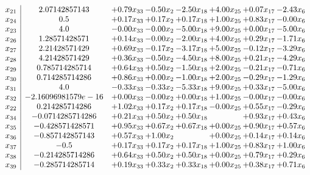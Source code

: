 \documentclass[8pt]{article}
\begin{document}
\[\begin{array}{c| c c@{\hskip 2pt} c@{\hskip 2pt} c@{\hskip 2pt} c@{\hskip 2pt} c@{\hskip 2pt} c@{\hskip 2pt} }
 x_{21}   &  2.07142857143 & +  0.79 x_{33} & -0.50 x_{2} & -2.50 x_{18} & +  4.00 x_{25} & +  0.07 x_{17} & -2.43 x_{6}\\
 x_{24}   &  0.5 & +  0.17 x_{33} & +  0.17 x_{2} & +  0.17 x_{18} & +  1.00 x_{25} & +  0.83 x_{17} & -0.00 x_{6}\\
 x_{23}   &  4.0 & -0.00 x_{33} & -0.00 x_{2} & -5.00 x_{18} & +  9.00 x_{25} & +  0.00 x_{17} & -5.00 x_{6}\\
 x_{26}   &  1.28571428571 & +  0.14 x_{33} & -0.00 x_{2} & -2.00 x_{18} & +  4.00 x_{25} & +  0.29 x_{17} & -1.71 x_{6}\\
 x_{27}   &  2.21428571429 & +  0.69 x_{33} & -0.17 x_{2} & -3.17 x_{18} & +  5.00 x_{25} & -0.12 x_{17} & -3.29 x_{6}\\
 x_{28}   &  4.21428571429 & +  0.36 x_{33} & -0.50 x_{2} & -4.50 x_{18} & +  8.00 x_{25} & +  0.21 x_{17} & -4.29 x_{6}\\
 x_{29}   &  0.785714285714 & +  0.64 x_{33} & +  0.50 x_{2} & -1.50 x_{18} & +  2.00 x_{25} & -0.21 x_{17} & -0.71 x_{6}\\
 x_{30}   &  0.714285714286 & +  0.86 x_{33} & +  0.00 x_{2} & -1.00 x_{18} & +  2.00 x_{25} & -0.29 x_{17} & -1.29 x_{6}\\
 x_{31}   &  4.0 & -0.33 x_{33} & -0.33 x_{2} & -5.33 x_{18} & +  9.00 x_{25} & +  0.33 x_{17} & -5.00 x_{6}\\
 x_{32}   &  -2.16096981579e-16 & +  0.00 x_{33} & -0.00 x_{2} & +  0.00 x_{18} & +  1.00 x_{25} & -0.00 x_{17} & -0.00 x_{6}\\
 x_{22}   &  0.214285714286 & +  1.02 x_{33} & +  0.17 x_{2} & +  0.17 x_{18} & -0.00 x_{25} & +  0.55 x_{17} & -0.29 x_{6}\\
 x_{34}   &  -0.0714285714286 & +  0.21 x_{33} & +  0.50 x_{2} & +  0.50 x_{18} &   & +  0.93 x_{17} & +  0.43 x_{6}\\
 x_{35}   &  -0.428571428571 & +  0.95 x_{33} & +  0.67 x_{2} & +  0.67 x_{18} & +  0.00 x_{25} & +  0.90 x_{17} & +  0.57 x_{6}\\
 x_{36}   &  -0.857142857143 & +  0.57 x_{33} & +  1.00 x_{2} &   & +  0.00 x_{25} & +  0.14 x_{17} & +  0.14 x_{6}\\
 x_{37}   &  -0.5 & +  0.17 x_{33} & +  0.17 x_{2} & +  0.17 x_{18} & +  1.00 x_{25} & +  0.83 x_{17} & +  1.00 x_{6}\\
 x_{38}   &  -0.214285714286 & +  0.64 x_{33} & +  0.50 x_{2} & +  0.50 x_{18} & +  0.00 x_{25} & +  0.79 x_{17} & +  0.29 x_{6}\\
 x_{39}   &  -0.285714285714 & +  0.19 x_{33} & +  0.33 x_{2} & +  0.33 x_{18} & +  0.00 x_{25} & +  0.38 x_{17} & +  0.71 x_{6}\\

\end{array}\]
\end{document}
